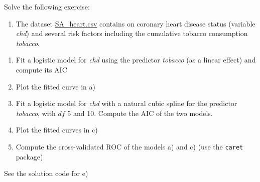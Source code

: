 \documentclass[
]{book}
\providecommand{\tightlist}{%
  \setlength{\itemsep}{0pt}\setlength{\parskip}{0pt}}
\begin{document}
Solve the following exercise:

\begin{enumerate}
\def\labelenumi{\arabic{enumi})}
\tightlist
\item
  The dataset \href{https://www.dropbox.com/s/cwkw3p91zyizcqz/SA_heart.csv?dl=1}{SA\_heart.csv}
  contains on coronary heart disease status (variable \emph{chd}) and several risk
  factors including the cumulative tobacco consumption \emph{tobacco}.
\end{enumerate}

\begin{enumerate}
\def\labelenumi{\alph{enumi})}
\item
  Fit a logistic model for \emph{chd} using the predictor \emph{tobacco}
  (as a linear effect) and compute its AIC
\item
  Plot the fitted curve in a)
\item
  Fit a logistic model for \emph{chd} with a natural cubic spline for the predictor \emph{tobacco}, with \(df\) 5 and 10. Compute the AIC of the two models.
\item
  Plot the fitted curves in c)
\item
  Compute the cross-validated ROC of the models a) and c) (use the \texttt{caret} package)
\end{enumerate}

See the solution code for e)
\end{document}
